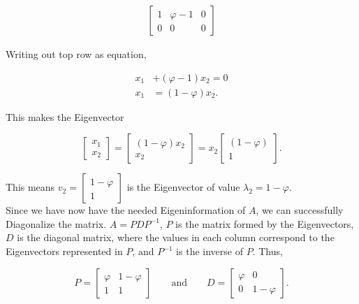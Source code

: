 \documentclass{article}
\begin{document}
\begin{align*} \left[ \begin{array}{cc|c} 1 &  \varphi-1 & 0 \\ 0  & 0 & 0 \end{array}  \right] \end{align*}

Writing out top row as equation,

\begin{align*}
    x_1 &+(\varphi-1) x_2 = 0\\
    x_1 &= (1-\varphi) x_2.
\end{align*}

This makes the Eigenvector

\begin{equation*}
    \begin{bmatrix} x_1 \\ x_2 \end{bmatrix} = \begin{bmatrix} (1-\varphi) x_2 \\ x_2 \end{bmatrix} = x_2 \begin{bmatrix} (1-\varphi) \\ 1 \end{bmatrix}.
\end{equation*}

This means $v_2=\begin{bmatrix} 1-\varphi \\ 1 \end{bmatrix}$ is the Eigenvector of value $\lambda_2=1-\varphi$. \\

Since we have now have the needed Eigeninformation of $A$, we can successfully Diagonalize the matrix. $A = PDP^{-1}$, $P$ is the matrix formed by the Eigenvectors, $D$ is the diagonal matrix, where the values in each column correspond to the Eigenvectors represented in $P$, and $P^{-1}$ is the inverse of $P$. Thus,

\begin{equation*}
    P = \begin{bmatrix}
            \varphi & 1-\varphi \\
             1 & 1
        \end{bmatrix} \qquad \text{and} \qquad
    D = \begin{bmatrix}
            \varphi & 0 \\
            0 & 1-\varphi
        \end{bmatrix}.
\end{equation*}
\end{document}
